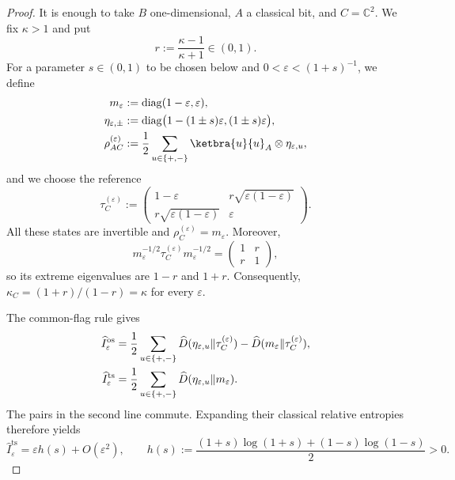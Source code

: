\documentclass[11pt]{article}
\theoremstyle{remark}
\DeclareMathOperator{\os}{os}
\DeclareMathOperator{\ts}{ts}
\newcommand{\1}{\mathbbm{1}}
\begin{document}
\begin{proof}
It is enough to take $B$ one-dimensional, $A$ a classical bit, and
$C=\mathbb C^2$.  We fix $\kappa>1$ and put
\begin{equation}
 r:=\frac{\kappa-1}{\kappa+1}\in(0,1).
\end{equation}
For a parameter $s\in(0,1)$ to be chosen below and
$0<\varepsilon<(1+s)^{-1}$, we define
\begin{align}
 m_\varepsilon
 &:=\operatorname{diag}(1-\varepsilon,\varepsilon),\notag\\
 \eta_{\varepsilon,\pm}
 &:=\operatorname{diag}
 \bigl(1-(1\pm s)\varepsilon,(1\pm s)\varepsilon\bigr),\notag\\
 \rho_{AC}^{(\varepsilon)}
 &:=\frac12\sum_{u\in\{+,-\}}
 \ketbra{u}{u}_A\otimes\eta_{\varepsilon,u},
 \label{eq:consolidated-BS-factor-cq-family}
\end{align}
and we choose the reference
\begin{equation}
 \tau_C^{(\varepsilon)}
 :=\begin{pmatrix}
  1-\varepsilon&r\sqrt{\varepsilon(1-\varepsilon)}\\
  r\sqrt{\varepsilon(1-\varepsilon)}&\varepsilon
 \end{pmatrix}.
 \label{eq:consolidated-BS-factor-reference}
\end{equation}
All these states are invertible and $\rho_C^{(\varepsilon)}=m_\varepsilon$.
Moreover,
\begin{equation}
 m_\varepsilon^{-1/2}\tau_C^{(\varepsilon)}m_\varepsilon^{-1/2}
 =\begin{pmatrix}1&r\\r&1\end{pmatrix},
\end{equation}
so its extreme eigenvalues are $1-r$ and $1+r$.  Consequently,
$\kappa_C=(1+r)/(1-r)=\kappa$ for every $\varepsilon$.

The common-flag rule gives
\begin{align}
 \widehat I^{\os}_\varepsilon
 &=\frac12\sum_{u\in\{+,-\}}
   \widehat D(\eta_{\varepsilon,u}\Vert
                    \tau_C^{(\varepsilon)})
   -\widehat D(m_\varepsilon\Vert
                    \tau_C^{(\varepsilon)}),\notag\\
 \widehat I^{\ts}_\varepsilon
 &=\frac12\sum_{u\in\{+,-\}}
   \widehat D(\eta_{\varepsilon,u}\Vert m_\varepsilon).
 \label{eq:consolidated-BS-factor-flag-identities}
\end{align}
The pairs in the second line commute.  Expanding their classical
relative entropies therefore yields
\begin{equation}
 \widehat I^{\ts}_\varepsilon
 =\varepsilon h(s)+O(\varepsilon^2),
 \qquad
 h(s):=\frac{(1+s)\log(1+s)+(1-s)\log(1-s)}2>0.
 \label{eq:consolidated-BS-ts-asymptotic}
\end{equation}


\end{proof}
\end{document}
